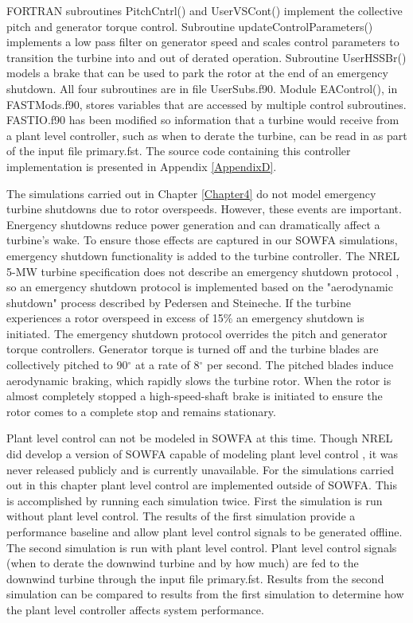 FORTRAN subroutines PitchCntrl() and UserVSCont() implement the collective pitch and generator torque control. Subroutine updateControlParameters() implements a low pass filter on generator speed and scales control parameters to transition the turbine into and out of derated operation. Subroutine UserHSSBr() models a brake that can be used to park the rotor at the end of an emergency shutdown. All four subroutines are in file UserSubs.f90. Module EAControl(), in FAST\textunderscore Mods.f90, stores variables that are accessed by multiple control subroutines. FAST\textunderscore IO.f90 has been modified so information that a turbine would receive from a plant level controller, such as when to derate the turbine, can be read in as part of the input file primary.fst. The source code containing this controller implementation is presented in Appendix \ref{AppendixD}.   

The simulations carried out in Chapter \ref{Chapter4} do not model emergency turbine shutdowns due to rotor overspeeds. However, these events are important. Energency shutdowns reduce power generation and can dramatically affect a turbine's wake. To ensure those effects are captured in our SOWFA simulations, emergency shutdown functionality is added to the turbine controller. The NREL 5-MW turbine specification does not describe an emergency shutdown protocol \cite{jonkman2009}, so an emergency shutdown protocol is implemented based on the "aerodynamic shutdown" process described by Pedersen and Steineche.\cite{pedersen2012} If the turbine experiences a rotor overspeed in excess of 15\% an emergency shutdown is initiated. The emergency shutdown protocol overrides the pitch and generator torque controllers. Generator torque is turned off and the turbine blades are collectively pitched to 90$^{\circ}$ at a rate of 8$^{\circ}$ per second. The pitched blades induce aerodynamic braking, which rapidly slows the turbine rotor. When the rotor is almost completely stopped a high-speed-shaft brake is initiated to ensure the rotor comes to a complete stop and remains stationary.

Plant level control can not be modeled in SOWFA at this time. Though NREL did develop a version of SOWFA capable of modeling plant level control \cite{fleming2013,fleming2013a}, it was never released publicly and is currently unavailable. For the simulations carried out in this chapter plant level control are implemented outside of SOWFA. This is accomplished by running each simulation twice. First the simulation is run without plant level control. The results of the first simulation provide a performance baseline and allow plant level control signals to be generated offline. The second simulation is run with plant level control. Plant level control signals (when to derate the downwind turbine and by how much) are fed to the downwind turbine through the input file primary.fst. Results from the second simulation can be compared to results from the first simulation to determine how the plant level controller affects system performance. 

